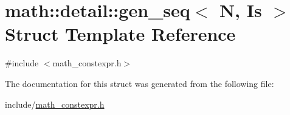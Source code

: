 \hypertarget{structmath_1_1detail_1_1gen__seq}{}\section{math\+:\+:detail\+:\+:gen\+\_\+seq$<$ N, Is $>$ Struct Template Reference}
\label{structmath_1_1detail_1_1gen__seq}


{\ttfamily \#include $<$math\+\_\+constexpr.\+h$>$}



The documentation for this struct was generated from the following file\+:\begin{DoxyCompactItemize}
\item 
include/\hyperlink{math__constexpr_8h}{math\+\_\+constexpr.\+h}\end{DoxyCompactItemize}
